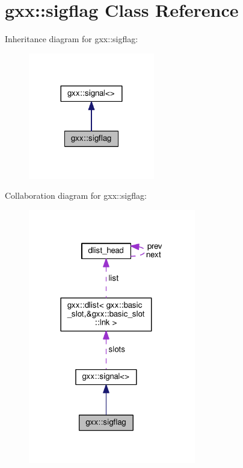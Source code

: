 \hypertarget{classgxx_1_1sigflag}{}\section{gxx\+:\+:sigflag Class Reference}
\label{classgxx_1_1sigflag}


Inheritance diagram for gxx\+:\+:sigflag\+:
\nopagebreak
\begin{figure}[H]
\begin{center}
\leavevmode
\includegraphics[width=156pt]{classgxx_1_1sigflag__inherit__graph}
\end{center}
\end{figure}


Collaboration diagram for gxx\+:\+:sigflag\+:
\nopagebreak
\begin{figure}[H]
\begin{center}
\leavevmode
\includegraphics[width=207pt]{classgxx_1_1sigflag__coll__graph}
\end{center}
\end{figure}
